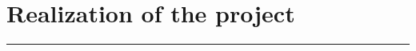 \documentclass [a4paper, 11pt]{article}
\begin{document}





\section{Realization of the project}
\rule{\textwidth}{0.4pt}\\
\end{document}
